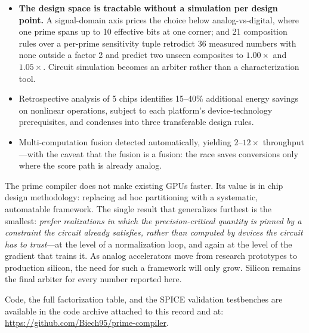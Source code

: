\documentclass[11pt]{article}
\begin{document}
\begin{itemize}[leftmargin=*]
\item \textbf{The design space is tractable without a simulation per design point.} A signal-domain axis prices the choice below analog-vs-digital, where one prime spans up to 10 effective bits at one corner; and 21 composition rules over a per-prime sensitivity tuple retrodict 36 measured numbers with none outside a factor 2 and predict two unseen composites to $1.00\times$ and $1.05\times$. Circuit simulation becomes an arbiter rather than a characterization tool.
\item Retrospective analysis of 5 chips identifies 15--40\% additional energy savings on nonlinear operations, subject to each platform's device-technology prerequisites, and condenses into three transferable design rules.
\item Multi-computation fusion detected automatically, yielding $2$--$12\times$ throughput---with the caveat that the fusion is a fusion: the race saves conversions only where the score path is already analog.
\end{itemize}

The prime compiler does not make existing GPUs faster. Its value is in chip design methodology: replacing ad hoc partitioning with a systematic, automatable framework. The single result that generalizes furthest is the smallest: \textit{prefer realizations in which the precision-critical quantity is pinned by a constraint the circuit already satisfies, rather than computed by devices the circuit has to trust}---at the level of a normalization loop, and again at the level of the gradient that trains it. As analog accelerators move from research prototypes to production silicon, the need for such a framework will only grow. Silicon remains the final arbiter for every number reported here.

Code, the full factorization table, and the SPICE validation testbenches are available in the code archive attached to this record and at: \url{https://github.com/Biech95/prime-compiler}.
\end{document}
